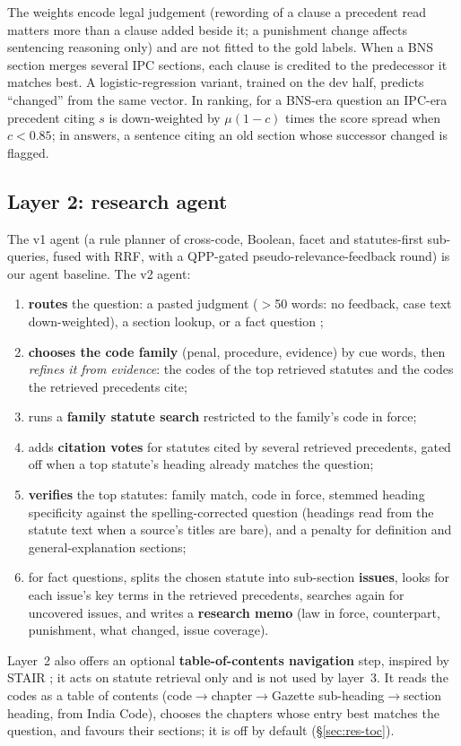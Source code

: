 \documentclass[sigconf,nonacm]{acmart}
\begin{document}
The weights encode legal judgement (rewording of a clause a precedent read matters more than a
clause added beside it; a punishment change affects sentencing reasoning only) and are not fitted to
the gold labels. When a BNS section merges several IPC sections, each clause is credited to the
predecessor it matches best. A logistic-regression variant, trained on the dev half, predicts
``changed'' from the same vector. In ranking, for a BNS-era question an IPC-era precedent citing
$s$ is down-weighted by $\mu(1-c)$ times the score spread when $c<0.85$; in answers, a sentence
citing an old section whose successor changed is flagged.

\subsection{Layer 2: research agent}

The v1 agent (a rule planner of cross-code, Boolean, facet and statutes-first sub-queries, fused
with RRF, with a QPP-gated pseudo-relevance-feedback round) is our agent baseline. The v2 agent:
\begin{enumerate}
\item \textbf{routes} the question: a pasted judgment ($>$50 words: no feedback, case text
down-weighted), a section lookup, or a fact question \cite{adaptiverag};
\item \textbf{chooses the code family} (penal, procedure, evidence) by cue words, then
\emph{refines it from evidence}: the codes of the top retrieved statutes and the codes the
retrieved precedents cite;
\item runs a \textbf{family statute search} restricted to the family's code in force;
\item adds \textbf{citation votes} for statutes cited by several retrieved precedents, gated off
when a top statute's heading already matches the question;
\item \textbf{verifies} the top statutes: family match, code in force, stemmed heading specificity
against the spelling-corrected question (headings read from the statute text when a source's
titles are bare), and a penalty for definition and general-explanation sections;
\item for fact questions, splits the chosen statute into sub-section \textbf{issues}, looks for each
issue's key terms in the retrieved precedents, searches again for uncovered issues, and writes a
\textbf{research memo} (law in force, counterpart, punishment, what changed, issue coverage).
\end{enumerate}
Layer~2 also offers an optional \textbf{table-of-contents navigation} step, inspired by STAIR
\cite{stair}; it acts on statute retrieval only and is not used by layer~3. It reads the
codes as a table of contents (code$\to$chapter$\to$Gazette sub-heading$\to$section heading, from
India Code), chooses the chapters whose entry best matches the question, and favours their
sections; it is off by default (\S\ref{sec:res-toc}).
\end{document}
